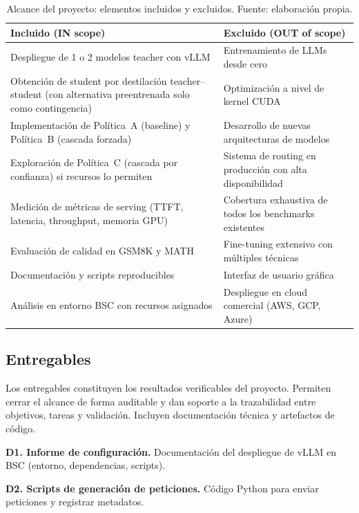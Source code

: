 \documentclass[11pt,a4paper]{article}
\begin{document}
\begin{table}[H]
\centering
\caption{Alcance del proyecto: elementos incluidos y excluidos. Fuente: elaboración propia.}
\label{tab:scope}
\small
\begin{tabular}{>{\raggedright\arraybackslash}p{6.5cm} >{\raggedright\arraybackslash}p{6.5cm}}
\toprule
\textbf{Incluido (IN scope)} & \textbf{Excluido (OUT of scope)} \\
\midrule
Despliegue de 1 o 2 modelos teacher con vLLM & Entrenamiento de LLMs desde cero \\
\addlinespace
Obtención de student por destilación teacher--student (con alternativa preentrenada solo como contingencia) & Optimización a nivel de kernel CUDA \\
\addlinespace
Implementación de Política~A (baseline) y Política~B (cascada forzada) & Desarrollo de nuevas arquitecturas de modelos \\
\addlinespace
Exploración de Política~C (cascada por confianza) si recursos lo permiten & Sistema de routing en producción con alta disponibilidad \\
\addlinespace
Medición de métricas de serving (TTFT, latencia, throughput, memoria GPU) & Cobertura exhaustiva de todos los benchmarks existentes \\
\addlinespace
Evaluación de calidad en GSM8K y MATH & Fine-tuning extensivo con múltiples técnicas \\
\addlinespace
Documentación y scripts reproducibles & Interfaz de usuario gráfica \\
\addlinespace
Análisis en entorno BSC con recursos asignados & Despliegue en cloud comercial (AWS, GCP, Azure) \\
\bottomrule
\end{tabular}
\end{table}

\subsection{Entregables}

Los entregables constituyen los resultados verificables del proyecto. Permiten cerrar el alcance de forma auditable y dan soporte a la trazabilidad entre objetivos, tareas y validación. Incluyen documentación técnica y artefactos de código.

\textbf{D1. Informe de configuración.} Documentación del despliegue de vLLM en BSC (entorno, dependencias, scripts).

\textbf{D2. Scripts de generación de peticiones.} Código Python para enviar peticiones y registrar metadatos.
\end{document}

